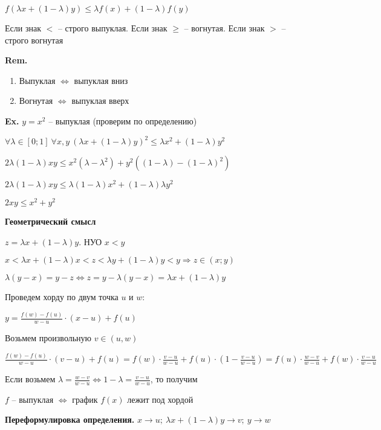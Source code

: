 \documentclass[14pt, letter paper]{article}
\begin{document}
$f(\lambda x + (1 - \lambda)y) \leq \lambda f(x) + (1 - \lambda)f(y)$

Если знак $<$ -- строго выпуклая. Если знак $\geq$ -- вогнутая. Если знак $>$ -- строго вогнутая

\textbf{Rem.} \begin{enumerate}
    \item Выпуклая $\Leftrightarrow$ выпуклая вниз
    \item Вогнутая $\Leftrightarrow$ выпуклая вверх
\end{enumerate}

\textbf{Ex.} $y = x^2$ -- выпуклая (проверим по определению)

$\forall \lambda \in [0; 1]\ \forall x, y\ (\lambda x + (1 - \lambda)y)^2 \leq \lambda x^2 + (1 - \lambda)y^2$

$2\lambda(1 - \lambda)xy \leq x^2(\lambda - \lambda^2) + y^2((1 - \lambda) - (1 - \lambda)^2)$

$2\lambda(1 - \lambda)xy \leq \lambda(1 - \lambda)x^2 + (1 - \lambda)\lambda y^2$

$2xy \leq x^2 + y^2$

\vspace{5mm}

\textbf{Геометрический смысл} 

$z = \lambda x + (1 - \lambda) y$. НУО $x < y$

$x < \lambda x + (1 - \lambda)x < z < \lambda y + (1 - \lambda)y < y \Rightarrow z \in (x; y)$

$\lambda (y - x) = y - z \Leftrightarrow z = y - \lambda (y - x) = \lambda x + (1 - \lambda)y$

Проведем хорду по двум точка $u$ и $w$:

$y = \frac{f(w) - f(u)}{w - u} \cdot (x - u) + f(u)$

Возьмем произвольную $v \in (u, w)$

$\frac{f(w) - f(u)}{w - u} \cdot (v - u) + f(u) = f(w) \cdot \frac{v - u}{w - u} + f(u) \cdot (1 - \frac{v - u}{w - u}) = f(u) \cdot \frac{w - v}{w - u} + f(w) \cdot \frac{v - u}{w - u}$

Если возьмем $\lambda = \frac{w - v}{w - u} \Leftrightarrow 1 - \lambda = \frac{v - u}{w - u}$, то получим

$f$ -- выпуклая $\Leftrightarrow$ график $f(x)$ лежит под хордой 

\vspace{5mm}

\textbf{Переформулировка определения.} $x \rightarrow u;\ \lambda x + (1 - \lambda)y \rightarrow v;\ y \rightarrow w$
\end{document}
